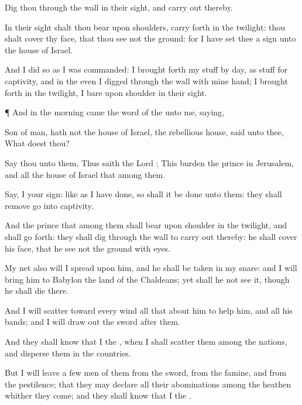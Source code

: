 {Dig thou through the
wall in their
sight, and carry
out thereby.

In their
sight shalt thou
bear
{} upon
{}
shoulders,
{} carry
{}
forth in the
twilight: thou shalt
cover thy
face, that thou
see not the
ground: for I have
set thee
{} a
sign unto the
house of
Israel.

And I
did so as I was
commanded: I brought
forth my
stuff by
day, as
stuff for
captivity, and in the
even I
digged through the
wall with mine
hand; I brought
{}
forth in the
twilight,
{} I
bare
{} upon
{}
shoulder in their
sight.


\par }{\PP {}¶ And in the
morning came the
word of the
{} unto me,
saying,

Son of
man, hath not the
house of
Israel, the
rebellious
house,
said unto thee, What
doest thou?

Say thou unto them, Thus
saith the
Lord
{}; This
burden
{} the
prince in
Jerusalem, and all the
house of
Israel that
{}
among them.

Say, I
{} your
sign: like as I have
done, so shall it be
done unto them: they shall
remove
{}
go into
captivity.

And the
prince that
{}
among them shall
bear upon
{}
shoulder in the
twilight, and shall go
forth: they shall
dig through the
wall to carry
out thereby: he shall
cover his
face,
that he
see not the
ground with
{}
eyes.

My
net also will I
spread upon him, and he shall be
taken in my
snare: and I will
bring him to
Babylon
{} the
land of the
Chaldeans; yet shall he not
see it, though he shall
die there.

And I will
scatter toward every
wind all that
{}
about him to
help him, and all his
bands; and I will draw
out the
sword
after them.

And they shall
know that I
{} the
{}, when I shall
scatter them among the
nations, and
disperse them in the
countries.

But I will
leave a
few
men of them from the
sword, from the
famine, and from the
pestilence; that they may
declare all their
abominations among the
heathen whither they
come; and they shall
know that I
{} the
{}.


}
